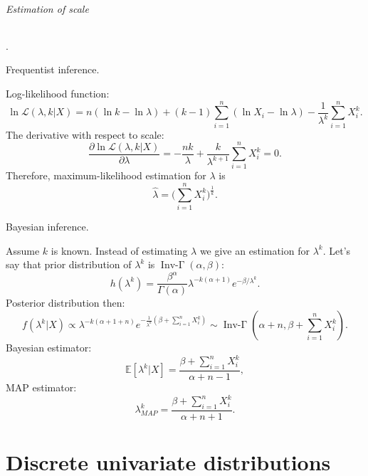 \documentclass[a4paper,11pt]{article}
\theoremstyle{plain}
\theoremstyle{definition}
\newcommand{\ME}{\mathbb{E}}
\begin{document}
\paragraph{Estimation of scale}.
\subparagraph{Frequentist inference.} Log-likelihood function:
\[
\ln \mathcal{L}(\lambda, k|X) = n (\ln k - \ln \lambda) + (k-1)\sum_{i=1}^{n}(\ln X_i - \ln \lambda) - \frac{1}{\lambda^k}\sum_{i=1}^{n} X_i^k.
\]
The derivative with respect to scale:
\[
\frac{\partial\ln \mathcal{L}(\lambda, k|X) }{\partial \lambda} = -\frac{n k}{\lambda} + \frac{k}{\lambda^{k+1}} \sum_{i=1}^{n} X_i^k=0.
\]
Therefore, maximum-likelihood estimation for $\lambda$ is
\[
\hat{\lambda} = \bigg(\sum_{i=1}^{n}X_i^k\bigg)^{\frac{1}{k}}.
\]
\subparagraph{Bayesian inference.} Assume $k$ is known. Instead of estimating $\lambda$ we give an estimation for $\lambda^k$. Let's say that prior distribution of $\lambda^k$ is $\operatorname{Inv-\Gamma}(\alpha, \beta)$:
\[
h(\lambda^k) = \frac{\beta^\alpha}{\Gamma(\alpha)} \lambda^{-k(\alpha+1)} e^{-\beta / \lambda^k}.
\]
Posterior distribution then:
\[
f(\lambda^k| X) \propto \lambda^{-k(\alpha+1+n)} e^{-\frac{1}{\lambda^k} (\beta+\sum_{i=1}^{n}X_i^k)} \sim \operatorname{Inv-\Gamma}(\alpha+n, \beta+\sum_{i=1}^{n}X_i^k).
\]
Bayesian estimator:
\[
\ME[\lambda^k|X] = \frac{\beta+\sum_{i=1}^{n}X_i^k}{\alpha+n-1},
\]
MAP estimator:
\[
\lambda_{MAP}^k = \frac{\beta+\sum_{i=1}^{n}X_i^k}{\alpha+n+1}.
\]

	\pagebreak
	\part{Discrete univariate distributions}
\end{document}
